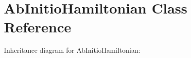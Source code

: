 \hypertarget{classAbInitioHamiltonian}{}\section{Ab\+Initio\+Hamiltonian Class Reference}
\label{classAbInitioHamiltonian}


Inheritance diagram for Ab\+Initio\+Hamiltonian\+:
